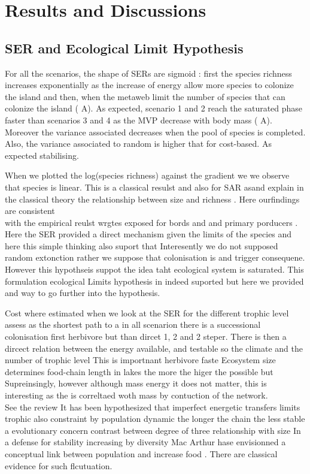 \section{Results and Discussions}\label{results-and-discussions}

\subsection{SER and Ecological Limit
Hypothesis}\label{ser-and-ecological-limit-hypothesis}

For all the scenarios, the shape of SERs are sigmoid : first the species
richness increases exponentially as the increase of energy allow more
species to colonize the island and then, when the metaweb limit the
number of species that can colonize the island (\citet{fig:etib1} A). As
expected, scenario 1 and 2 reach the saturated phase faster than
scenarios 3 and 4 as the MVP decrease with body mass (\citet{fig:etib1}
A). Moreover the variance associated decreases when the pool of species
is completed. Also, the variance associated to random is higher that for
cost-based. As expected stabilising.

When we plotted the log(species richness) against the gradient we we
observe that species is linear. This is a classical resulst and also for
SAR asand explain in the classical theory the relationship between size
and richness \citep{MacArthur1967a}. Here ourfindings are consistent\\
with the empirical reulst wrgtes exposed for bords and and primary
porducers \citep{Wright2983}. Here the SER provided a direct mechanism
given the limits of the species and here this simple thinking also
suport that Interesently we do not supposed random extonction rather we
suppose that colonisation is and trigger consequene. However this
hypothseis suppot the idea taht ecological system is saturated. This
formulation ecological Limits hypothesis in indeed suported but here we
provided and way to go further into the hypothesis.

Cost where estimated when we look at the SER for the different trophic
level assess as the shortest path to a in all scenarion there is a
successional colonisation first herbivore but than dircet 1, 2 and 2
steper. There is then a dircect relation between the energy available,
and testable so the climate and the number of trophic level This is
importnant herbivore faste Ecosystem size determines food-chain length
in lakes the more the higer the possible but Supreinsingly, however
although mass energy it does not matter, this is interesting as the is
correltaed woth mass by contuction of the network.\\
See the review \citet{Post2002} It has been hypothesized that imperfect
energetic transfers limits trophic also constraint by population dynamic
the longer the chain the less stable \citet{Pimm1978} a evolutionary
concern \citet{hastings1979} contrast between degree of three
relationship with size In a defense for stability increasing by
diversity Mac Arthur hase envisionned a conceptual link between
population and increase food \citet{MacArthur1955}. There are classical
evidence for such flcutuation.

